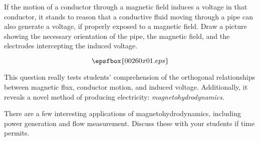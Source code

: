 

If the motion of a conductor through a magnetic field induces a voltage in that conductor, it stands to reason that a conductive fluid moving through a pipe can also generate a voltage, if properly exposed to a magnetic field.  Draw a picture showing the necessary orientation of the pipe, the magnetic field, and the electrodes intercepting the induced voltage.







$$\epsfbox{00260x01.eps}$$







This question really tests students' comprehension of the orthogonal relationships between magnetic flux, conductor motion, and induced voltage.  Additionally, it reveals a novel method of producing electricity: {\it magnetohydrodynamics}.

There are a few interesting applications of magnetohydrodynamics, including power generation and flow measurement.  Discuss these with your students if time permits.




